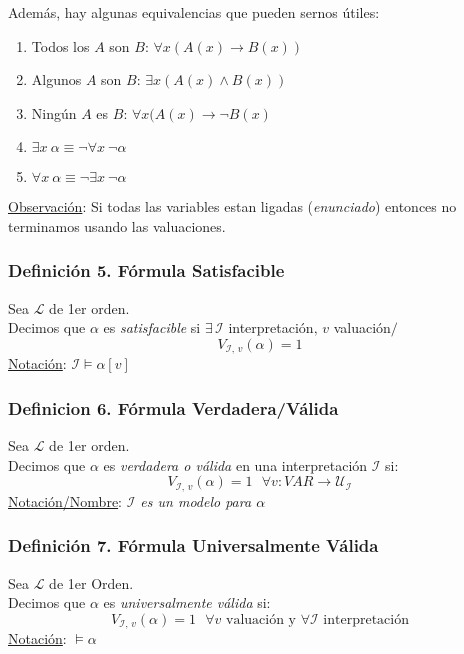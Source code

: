 \documentclass{article}
\newcommand{\comma}{,\,}                                %
\newcommand{\tq}{/\,}                                   %
\newcommand{\lenguaje}{\mathcal{L}}
\newcommand{\interpretacion}{\mathcal{I}}
\newcommand{\universo}{\mathcal{U}}
\begin{document}
Además, hay algunas equivalencias que pueden sernos útiles:
\begin{enumerate}
    \item Todos los $A$ son $B$: $ \forall x (A(x) \rightarrow B(x))$
    \item Algunos $A$ son $B$: $ \exists x (A(x) \wedge B(x))$
    \item Ningún $A$ es $B$: $ \forall x (A(x) \rightarrow \neg B(x)$
    \item $\exists x \: \alpha \equiv \neg \forall x \: \neg \alpha$
    \item $\forall x \: \alpha \equiv \neg \exists x \: \neg \alpha$
\end{enumerate}

\underline{Observación}: Si todas las variables estan ligadas (\emph{enunciado}) entonces no terminamos usando las valuaciones.

\subsubsection*{Definición 5. Fórmula Satisfacible}
Sea $\lenguaje$ de 1er orden.
\\Decimos que $\alpha$ es \emph{satisfacible} si $\exists\, \interpretacion$ interpretación$ \comma v $ valuación$\tq$
\begin{equation*}
    V_{\interpretacion \comma v}(\alpha) = 1
\end{equation*}
\underline{Notación}: $\interpretacion \vDash \alpha [v]$

\subsubsection*{Definicion 6. Fórmula Verdadera/Válida}
Sea $\lenguaje$ de 1er orden.
\\Decimos que $\alpha$ es \emph{verdadera o válida} en una interpretación $\interpretacion$ si:
\begin{equation*}
    V_{\interpretacion \comma v}(\alpha) = 1 \:\:\: \forall v:VAR \rightarrow \universo_\interpretacion
\end{equation*}
\underline{Notación/Nombre}: \emph{$\interpretacion$ es un modelo para $\alpha$}

\subsubsection*{Definición 7. Fórmula Universalmente Válida}
Sea $\lenguaje$ de 1er Orden.
\\Decimos que $\alpha$ es \emph{universalmente válida} si:
\begin{equation*}
    V_{\interpretacion \comma v}(\alpha) = 1 \:\:\: \forall v \text{ valuación y } \forall \interpretacion \text{ interpretación}
\end{equation*}
\underline{Notación}: $\vDash \alpha$
\end{document}
